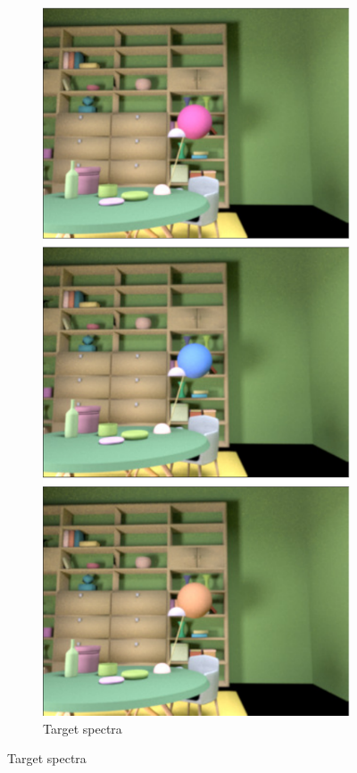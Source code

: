 \documentclass{jov}
\begin{document}
\begin{figure}
\begin{subfigure}[b]{0.18 \textwidth}
        \label{fig:targetSizeOrientation}
    \end{subfigure}
~
\centering
	\begin{subfigure}[b]{0.18 \textwidth}
    \centering
        \caption{Target spectra}
        \includegraphics[width=\textwidth]{../FiguresDraft5/Figure4/Figure4_c.pdf}

\end{subfigure}
\end{figure}
\end{document}
